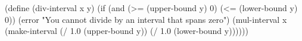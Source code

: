 \begtt\scm
(define (div-interval x y)
  (if (and (>= (upper-bound y) 0)
           (<= (lower-bound y) 0))
      (error "You cannot divide by an interval that spans zero")
      (mul-interval x
                    (make-interval (/ 1.0 (upper-bound y))
                                   (/ 1.0 (lower-bound y))))))
\endtt
